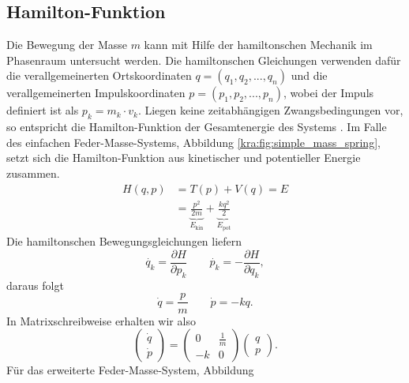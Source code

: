 \subsection{Hamilton-Funktion}
\label{kra:subsection:hamilton-funktion}
%
Die Bewegung der Masse $m$ kann mit Hilfe der hamiltonschen Mechanik
im Phasenraum untersucht werden.
%
%
Die hamiltonschen Gleichungen verwenden dafür die verallgemeinerten Ortskoordinaten
$q = (q_{1}, q_{2}, ..., q_{n})$ und die verallgemeinerten Impulskoordinaten $p = (p_{1}, p_{2}, ..., p_{n})$, wobei der Impuls definiert ist als $p_k = m_k \cdot v_k$.
Liegen keine zeitabhängigen Zwangsbedingungen vor, so entspricht die Hamilton-Funktion der Gesamtenergie des Systems \cite{kra:hamilton}.
Im Falle des einfachen Feder-Masse-Systems, Abbildung \ref{kra:fig:simple_mass_spring}, setzt sich die Hamilton-Funktion aus kinetischer und potentieller Energie zusammen.
\begin{equation}
    \label{kra:equation:harmonischer_oszillator}
    \begin{split}
        H(q, p) &= T(p) + V(q) = E \\
        &=
	\underbrace{\frac{p^2}{2m}}_{\displaystyle{E_{\text{kin}}}}
	+ \underbrace{\frac{k q^2}{2}}_{\displaystyle{E_{\text{pot}}}}
    \end{split}
\end{equation}
Die hamiltonschen Bewegungsgleichungen liefern \cite{kra:kanonischegleichungen}
%
\begin{equation}
    \label{kra:equation:bewegungsgleichung}
    \dot{q_{k}} = \frac{\partial H}{\partial p_k}
    \qquad
    \dot{p_{k}} = -\frac{\partial H}{\partial q_k},
\end{equation}
daraus folgt
\[
    \dot{q} = \frac{p}{m}
    \qquad
    \dot{p} = -kq.
\]
In Matrixschreibweise erhalten wir also
\[
    \begin{pmatrix}
        \dot{q} \\
        \dot{p}
    \end{pmatrix}
    =
    \begin{pmatrix}
        0  & \frac{1}{m} \\
        -k & 0
    \end{pmatrix}
    \begin{pmatrix}
        q \\
        p
    \end{pmatrix}
    .
\]
Für das erweiterte Feder-Masse-System, Abbildung
